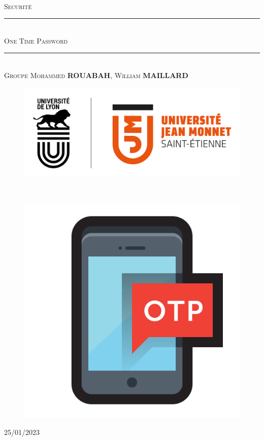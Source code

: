 \documentclass[a4paper, 10pt]{article}
\newcommand{\HRule}{\rule{\linewidth}{0.5mm}}
\begin{document}
\begin{titlepage}
  \begin{sffamily}
  \begin{center}

    \textsc{\LARGE }\\[2cm]

    \textsc{\Large Securité }\\[1.2cm]

    \HRule \\[0.4cm]
    { \huge  \textsc{One Time Password} \\ 
    [0.5cm]
    }
    \HRule \\[1cm]
        \textsc{Groupe Mohammed \textbf{ROUABAH}, William \textbf{MAILLARD}}

    \begin{figure}
        \centering
        \includegraphics[scale=0.2]{img/ujmlogo.png}
        \label{fig:ujm_logo}
    \end{figure}

    \
\vfill
    \begin{figure}[H]
        \centering
        \includegraphics[scale=0.35]{img/pin.png}
        \label{fig:ujm_logo}
    \end{figure}
\vfill

    {\large {} 25/01/2023}

  \end{center}
  \end{sffamily}
\end{titlepage}
\end{document}
